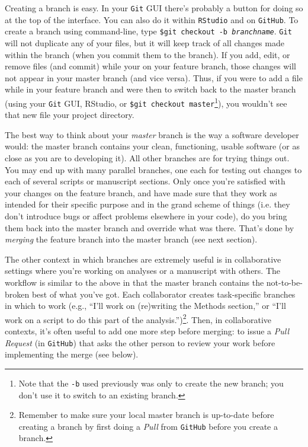 \documentclass[12pt,letterpaper]{article}
\begin{document}
Creating a branch is easy.
In your \texttt{Git} GUI there's probably a button for doing so at the top of 
the interface.
You can also do it within \texttt{RStudio} and on \texttt{GitHub}.
To create a branch using command-line, type \texttt{\$git checkout -b \emph{branchname}}.
\texttt{Git} will not duplicate any of your files, but it will keep track of all changes made within the branch (when you commit them to the branch).
If you add, edit, or remove files (and commit) while your on your feature branch, those changes will not appear in your master branch (and vice versa).
Thus, if you were to add a file while in your feature branch and were then to switch back to the master branch (using your \texttt{Git} GUI, RStudio, or \texttt{\$git checkout master}\footnote{Note that the \texttt{-b} used previously was only to create the new branch; you don't use it to switch to an existing branch.}), you wouldn't see that new file your project directory.

The best way to think about your \emph{master} branch is the way a software developer would:
the master branch contains your clean, functioning, usable software (or as close as you are to developing it).
All other branches are for trying things out.
You may end up with many parallel branches, one each for testing out changes to each of several scripts or manuscript sections.
Only once you're satisfied with your changes on the feature branch, and have made sure that they work as intended for their specific purpose and in the grand scheme of things (i.e. they don't introduce bugs or affect problems elsewhere in your code), do you bring them back into the master branch and override what was there.
That's done by \emph{merging} the feature branch into the master branch (see next section).

The other context in which branches are extremely useful is in collaborative settings where you're working on analyses or a manuscript with others.
The workflow is similar to the above in that the master branch contains the not-to-be-broken best of what you've got.
Each collaborator creates task-specific branches in which to work (e.g., ``I'll work on (re)writing the Methods section,'' or ``I'll work on a script to do this part of the analysis.'')\footnote{Remember to make sure your local master branch is up-to-date before creating a branch by first doing a \emph{Pull} from \texttt{GitHub} before you create a branch.}.
Then, in collaborative contexts, it's often useful to add one more step before merging:  to issue a \emph{Pull Request} (in \texttt{GitHub}) that asks the other person to review your work before implementing the merge (see below).
\end{document}
